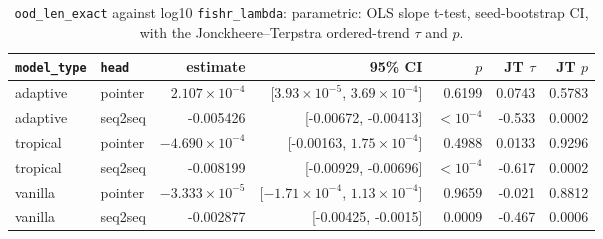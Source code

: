 \documentclass[10pt]{article}
\begin{document}
{\small
\begin{longtable}{llrrrrr}
\caption{\texttt{ood\_len\_exact} against log10 \texttt{fishr\_lambda}: parametric: OLS slope t-test, seed-bootstrap CI, with the Jonckheere--Terpstra ordered-trend $\tau$ and $p$.}\label{tab:trend-ood_len_exact}\\
\toprule
\texttt{model\_type} & \texttt{head} & estimate & 95\% CI & $p$ & JT $\tau$ & JT $p$\\
\midrule
\endhead
adaptive & pointer & $2.107\times10^{-4}$ & [$3.93\times10^{-5}$, $3.69\times10^{-4}$] & 0.6199 & 0.0743 & 0.5783\\
adaptive & seq2seq & -0.005426 & [-0.00672, -0.00413] & $<10^{-4}$ & -0.533 & 0.0002\\
tropical & pointer & $-4.690\times10^{-4}$ & [-0.00163, $1.75\times10^{-4}$] & 0.4988 & 0.0133 & 0.9296\\
tropical & seq2seq & -0.008199 & [-0.00929, -0.00696] & $<10^{-4}$ & -0.617 & 0.0002\\
vanilla & pointer & $-3.333\times10^{-5}$ & [$-1.71\times10^{-4}$, $1.13\times10^{-4}$] & 0.9659 & -0.021 & 0.8812\\
vanilla & seq2seq & -0.002877 & [-0.00425, -0.0015] & 0.0009 & -0.467 & 0.0006\\
\bottomrule
\end{longtable}
}
\end{document}
